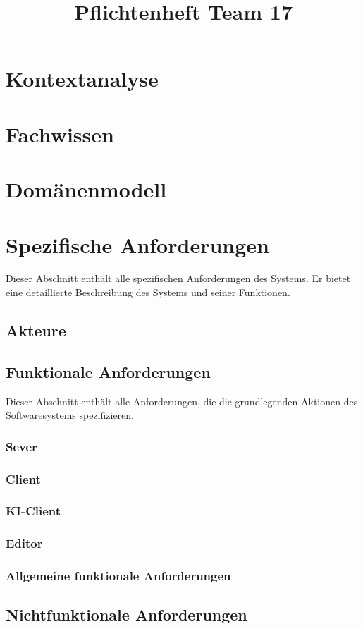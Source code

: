 \documentclass{uulm-assignment}
\title{Pflichtenheft Team 17}
\begin{document}
\maketitle

\listoftodos

\section{Kontextanalyse}


\clearpage
\section{Fachwissen}


\clearpage
\section{Domänenmodell}


\clearpage
\section{Spezifische Anforderungen}
Dieser Abschnitt enthält alle spezifischen Anforderungen des Systems. Er bietet eine detaillierte
Beschreibung des Systems und seiner Funktionen.


\subsection{Akteure}



\subsection{Funktionale Anforderungen}

Dieser Abschnitt enthält alle Anforderungen, die die grundlegenden Aktionen des Softwaresystems
spezifizieren.

\subsubsection{Sever}



\subsubsection{Client}

\subsubsection{KI-Client}

\subsubsection{Editor}

\subsubsection{Allgemeine funktionale Anforderungen}


\subsection{Nichtfunktionale Anforderungen}

\end{document}
